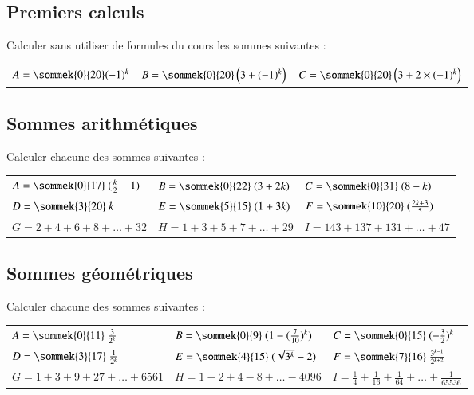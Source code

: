 \documentclass[oneside,12pt]{article}          %
\begin{document}
\subsection{Premiers calculs}
Calculer sans utiliser de formules du cours les sommes suivantes :

\begin{tabular}{p{} p{} p{}}
     $A=\sommek{0}{20}(-1)^k$ & $B=\sommek{0}{20}\left(3+(-1)^k\right)$ & $C=\sommek{0}{20}\left(3+2\times(-1)^k\right)$
\end{tabular}


\subsection{Sommes arithmétiques}
Calculer chacune des sommes suivantes :
 
\renewcommand{\arraystretch}{2.2}
\begin{tabular}{p{} p{} p{}}
     $A=\sommek{0}{17}~(\frac{k}{2}-1)$ & $B=\sommek{0}{22}~(3+2k)$ & $C=\sommek{0}{31}~(8-k)$ \\
     $D=\sommek{3}{20}~k$ & $E=\sommek{5}{15}~(1+3k)$ & $F=\sommek{10}{20}~(\frac{2k+3}{5})$ \\
     $G=2+4+6+8+\ldots+32$ & $H=1+3+5+7+\ldots+29$ & $I=143+137+131+\ldots+47$ \\
\end{tabular}



\subsection{Sommes géométriques}
Calculer chacune des sommes suivantes :

\renewcommand{\arraystretch}{2.5}
\begin{tabular}{p{} p{} p{}}
    $A=\sommek{0}{11}~\frac{3}{2^{k}}$ & $B=\sommek{0}{9}~(1-(\frac{7}{10})^{k}) $ & $C=\sommek{0}{15}~(-\frac{3}{2})^{k} $ \\
    $D=\sommek{3}{17}~\frac{1}{2^{k}} $ & $E=\sommek{4}{15}~(\sqrt{3^{k}}-2) $ & $F=\sommek{7}{16} ~\frac{3^{k-1}}{2^{k+2}}$ \\
     $G=1+3+9+27+\ldots+6561$ & $H=1-2+4-8+\ldots-4096$ & $I=\frac{1}{4}+\frac{1}{16}+\frac{1}{64}+\ldots+\frac{1}{65536}$    
\end{tabular}
\end{document}
